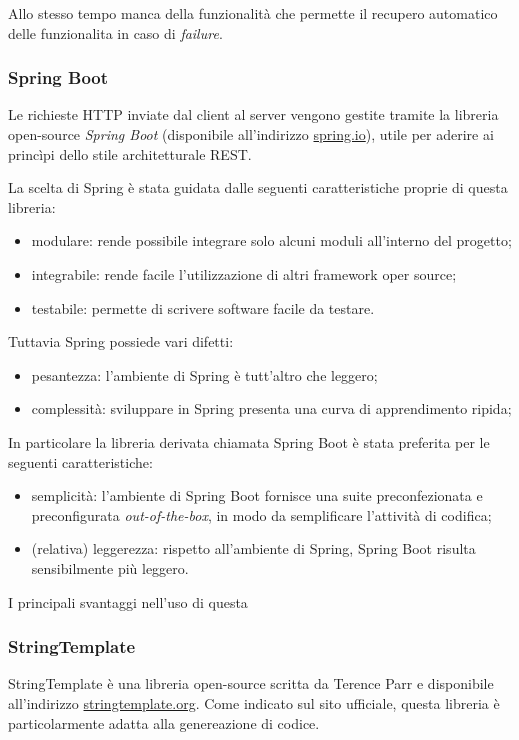 Allo stesso tempo manca della funzionalità che permette il recupero automatico delle funzionalita in caso di \emph{failure}.

\subsubsection{Spring Boot}
Le richieste HTTP inviate dal client al server vengono gestite tramite la libreria open-source \emph{Spring Boot} (disponibile all'indirizzo \url{spring.io}), utile per aderire ai princìpi dello stile architetturale REST.

La scelta di Spring è stata guidata dalle seguenti caratteristiche proprie di questa libreria:
\begin{itemize}
	\item modulare: rende possibile integrare solo alcuni moduli all'interno del progetto;
	\item integrabile: rende facile l'utilizzazione di altri framework oper source;
	\item testabile: permette di scrivere software facile da testare.
\end{itemize}

Tuttavia Spring possiede vari difetti:
\begin{itemize}
	\item pesantezza: l'ambiente di Spring è tutt'altro che leggero;
	\item complessità: sviluppare in Spring presenta una curva di apprendimento ripida;
\end{itemize}

In particolare la libreria derivata chiamata Spring Boot è stata preferita per le seguenti caratteristiche:
\begin{itemize}
	\item semplicità: l'ambiente di Spring Boot fornisce una suite preconfezionata e preconfigurata \emph{out-of-the-box}, in modo da semplificare l'attività di codifica;
	\item (relativa) leggerezza: rispetto all'ambiente di Spring, Spring Boot risulta sensibilmente più leggero.
\end{itemize}


I principali svantaggi nell'uso di questa 

\subsubsection{StringTemplate}
StringTemplate è una libreria open-source scritta da Terence Parr e disponibile all'indirizzo \url{stringtemplate.org}. Come indicato sul sito ufficiale, questa libreria è particolarmente adatta alla genereazione di codice. 

